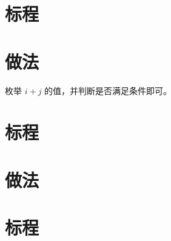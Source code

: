 \documentclass{ctsol}
\begin{document}
\section*{标程}

\makesolution
\section*{做法}

枚举 $i+j$ 的值，并判断是否满足条件即可。

\section*{标程}

\makesolution
\section*{做法}

\section*{标程}
\end{document}
